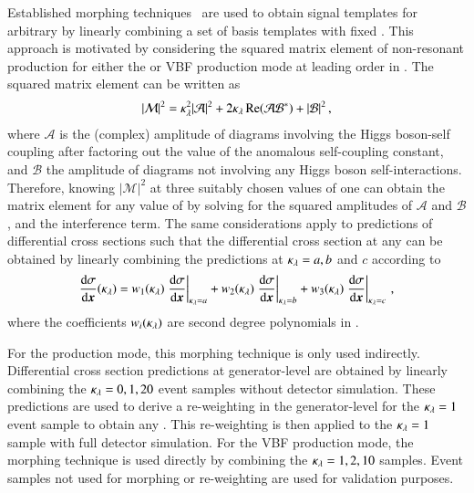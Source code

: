 Established morphing techniques~\cite{ATL-PHYS-PUB-2015-047} are used
to obtain signal templates for arbitrary \klambda by linearly
combining a set of basis templates with fixed \klambda. This approach
is motivated by considering the squared matrix element of non-resonant
\HH production for either the \ggF or VBF production mode at leading
order in \klambda. The squared matrix element can be written as
\begin{align*}
  |\mathcal{M}|^2 = \kappa_{\lambda}^2 |\mathcal{A}|^2 + 2 \kappa_{\lambda} \operatorname{Re}(\mathcal{A} \mathcal{B}^*) + |\mathcal{B}|^2 \,\text{,}
\end{align*}
where $\mathcal{A}$ is the (complex) amplitude of diagrams involving
the Higgs boson-self coupling after factoring out the value of the
anomalous self-coupling constant, and $\mathcal{B}$ the amplitude of
diagrams not involving any Higgs boson self-interactions. Therefore,
knowing $|\mathcal{M}|^2$ at three suitably chosen values of \klambda
one can obtain the matrix element for any value of \klambda by solving
for the squared amplitudes of $\mathcal{A}$ and $\mathcal{B}$, and the
interference term. The same considerations apply to predictions of
differential cross sections such that the differential cross section
at any \klambda can be obtained by linearly combining the predictions
at $\kappa_{\lambda} = a, b$ and $c$ according to
\begin{align*}
  \frac{\mathrm{d}\sigma}{\mathrm{d}\myvec{x}}(\klambda)
  = w_1(\klambda) \left. \frac{\mathrm{d}\sigma}{\mathrm{d}\myvec{x}} \right|_{\klambda = a}
  + w_2(\klambda) \left. \frac{\mathrm{d}\sigma}{\mathrm{d}\myvec{x}} \right|_{\klambda = b}
  + w_3(\klambda) \left. \frac{\mathrm{d}\sigma}{\mathrm{d}\myvec{x}} \right|_{\klambda = c} \,\text{,}
\end{align*}
where the coefficients $w_i(\kappa_{\lambda})$ are second degree polynomials
in \klambda.

For the \ggF production mode, this morphing technique is only used
indirectly. Differential cross section predictions at generator-level
are obtained by linearly combining the $\kappa_{\lambda} = 0, 1, 20$ event
samples without detector simulation. These predictions are used to
derive a re-weighting in the generator-level \mHH for the
$\kappa_{\lambda} = 1$ event sample to obtain any \klambda. This re-weighting
is then applied to the $\kappa_{\lambda} = 1$ sample with full detector
simulation. For the VBF production mode, the morphing technique is
used directly by combining the $\kappa_{\lambda} = 1, 2, 10$ samples. Event
samples not used for morphing or re-weighting are used for validation
purposes.

